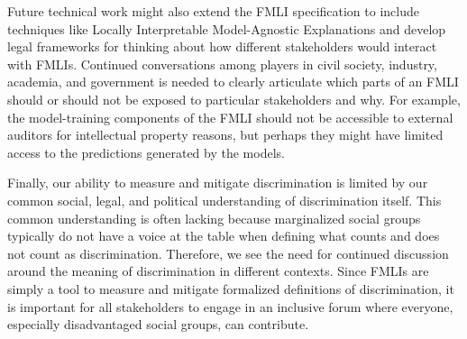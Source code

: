\documentclass{acm_proc_article-sp}
\begin{document}
Future technical work might also extend the FMLI specification to include
techniques like Locally Interpretable Model-Agnostic Explanations
\cite{ribeiro2016should} and develop legal frameworks for thinking about how
different stakeholders would interact with FMLIs. Continued conversations among
players in civil society, industry, academia, and government is needed to
clearly articulate which parts of an FMLI should or should not be exposed to
particular stakeholders and why. For example, the model-training components
of the FMLI should not be accessible to external auditors for intellectual
property reasons, but perhaps they might have limited access to the predictions
generated by the models.

Finally, our ability to measure and mitigate discrimination is limited by our
common social, legal, and political understanding of discrimination itself. This
common understanding is often lacking because marginalized social groups
typically do not have a voice at the table when defining what counts and does
not count as discrimination. Therefore, we see the need for continued discussion
around the meaning of discrimination in different contexts. Since FMLIs are
simply a tool to measure and mitigate formalized definitions of discrimination,
it is important for all stakeholders to engage in an inclusive forum where
everyone, especially disadvantaged social groups, can contribute.




\nocite{*}


\end{document}
